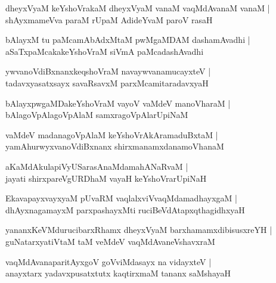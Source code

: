 \documentclass[twoside,12pt,openright]{book}
\newcounter{shloka}[chapter]
\begin{document}
\begin{shloka}%
dheyxVyaM keYshoVrakaM dheyxVyaM vanaM vaqMdAvanaM vanaM |\\
shAyxmameVva paraM rUpaM AdideYvaM paroV rasaH 
\end{shloka}

\begin{shloka}%
bAlayxM tu paMcamAbAdxMtaM pwMgaMDAM dashamAvadhi |\\
aSaTxpaMcakakeYshoVraM siVmA paMcadashAvadhi
\end{shloka}

\begin{shloka}%
ywvanoVdiBxnanxkeqshoVraM navaywvanamucayxteV |\\
tadavxyasatxsayx savaRsavxM parxMcamitaradavxyaH 
\end{shloka}

\begin{shloka}%
bAlayxpwgaMDakeYshoVraM vayoV vaMdeV manoVharaM |\\
bAlagoVpAlagoVpAlaM samxragoVpAlarUpiNaM
\end{shloka}

\begin{shloka}%
vaMdeV madanagoVpAlaM keYshoVrAkAramaduBxtaM |\\
yamAhurwyxvanoVdiBxnanx shirxmanamxdanamoVhanaM 
\end{shloka}

\begin{shloka}%
aKaMdAkulapiVyUSarasAnaMdamahANaRvaM |\\
jayati shirxpareVgURDhaM vayaH keYshoVrarUpiNaH 
\end{shloka}

\begin{shloka}%
EkavapayxvayxyaM pUvaRM vaqlalxviVvaqMdamadhayxgaM |\\
dhAyxnagamayxM parxpashayxMti ruciBeVdAtapxqthagidhxyaH
\end{shloka}

\begin{shloka}%
yananxKeVMdurucibarxRhamx dheyxVyaM barxhamamxdibisusxreYH |\\
guNatarxyatiVtaM taM veMdeV vaqMdAvaneVshavxraM 
\end{shloka}

\begin{shloka}%
vaqMdAvanaparitAyxgoV goVviMdasayx na vidayxteV |\\
anayxtarx yadavxpusatxtutx kaqtirxmaM tananx saMshayaH 
\end{shloka}
\end{document}
